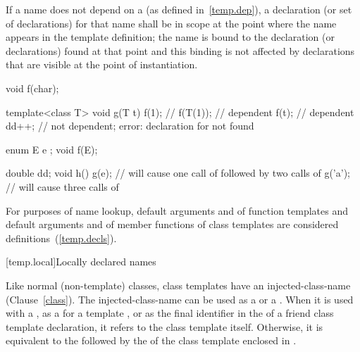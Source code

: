 \pnum
If a name does not depend on a
(as defined in~\ref{temp.dep}), a declaration (or set of declarations) for that
name shall be in scope at the point where the name appears in the template
definition; the name is bound to the declaration (or declarations) found
at that point and this binding is not affected by declarations that are
visible at the point of instantiation.
\begin{example}

\begin{codeblock}
void f(char);

template<class T> void g(T t) {
  f(1);             // 
  f(T(1));          // dependent
  f(t);             // dependent
  dd++;             // not dependent; error: declaration for  not found
}

enum E { e };
void f(E);

double dd;
void h() {
  g(e);             // will cause one call of  followed by two calls of 
  g('a');           // will cause three calls of 
}
\end{codeblock}
\end{example}

\pnum
\begin{note}
For purposes of name lookup, default arguments and
 of function templates and default
arguments and  of
member functions of class templates are considered definitions~(\ref{temp.decls}).
\end{note}

[temp.local]{Locally declared names}

\pnum
Like normal (non-template) classes, class templates have an
injected-class-name (Clause~\ref{class}).
The
injected-class-name can be used
as a  or a .
When it is used with a
,
as a  for a template ,
or as the final identifier in the  of
a friend class template declaration,
it refers to the
class template itself. Otherwise, it is equivalent to the 
followed by the  of the class template
enclosed in \tcode{<>}.

